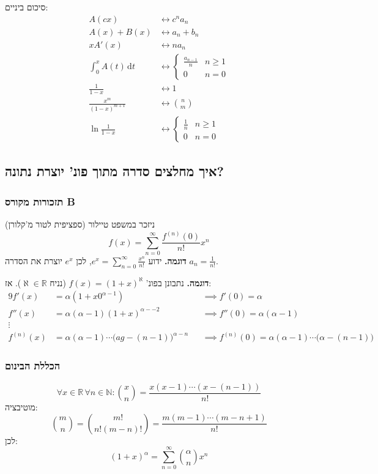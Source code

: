 \documentclass[]{article}
\newcommand\N     {\mathbb{N}}
\newcommand\R     {\mathbb{R}}
\newcommand\siff  {\longleftrightarrow}
\newcommand\al    {\aleph}
\newcommand\dt    {\,\mathrm{d}t}
\renewcommand\inf {\infty}
\newcommand\nsuminf   {\sum_{n = 0}^\inf}
\newcommand\co        {\colon}
\newcommand\ag        {\alpha}
\begin{document}
	
	סיכום ביניים: 
	\begin{align*}
		A(cx) & \siff c^na_n \\
		A(x) + B(x) & \siff a_n + b_n \\
		xA'(x) &\siff na_n \\
		\int^x_0 A(t) \dt& \siff \begin{cases}
			\frac{a_{n - 1}}{n} & n \ge 1\\
			0 & n = 0
		\end{cases} \\
		\frac{1}{1 - x} & \siff 1 \\
		\frac{x^m}{(1 - x)^{m + 1}} & \siff \binom{n}{m} \\
		\ln \frac{1}{1 - x} & \siff \begin{cases}
			\frac{1}{n} & n \ge 1\\
			0 & n = 0
		\end{cases}
	\end{align*}
	
	
	\subsection{איך מחלצים סדרה מתוך פונ' יוצרת נתונה? }
	\subsubsection{תזכורות מקורס B}
	ניזכר במשפט טיילור (ספציפית לטור מ'קלורן)
	\[ f(x) = \nsuminf \frac{f^{(n)}(0)}{n!}x^{n} \]
	\textbf{דוגמה. }ידוע $e^x = \nsuminf \frac{x^n}{n!}$, לכן $e^x$ יוצרת את הסדרה $a_n = \frac{1}{n!}$. 
	
	\textbf{דוגמה. }נתבונן בפונ' $f(x) = (1 + x)^{\al}$ (נניח $\al \in \R$). אז: 
	\begin{alignat*}{9}
		f'(x) &= \ag(1 + x0^{\ag - 1}) && \implies f'(0) = \ag \\
		f''(x) &= \ag(\ag - 1)(1 + x)^{\ag - -2} && \implies f''(0) = \ag(\ag - 1) \\
		\vdots \\
		f^{(n)}(x) &= \ag(\ag - 1) \cdots \big(ag - (n - 1)\big)^{\ag - n} &&\implies f^{(n)}(0) = \ag(\ag - 1) \cdots \big(\ag - (n  - 1) \big )
	\end{alignat*}
	
	\subsubsection{הכללת הבינום}
	\[ \forall x \in \R \, \forall n \in \N \co \binom{x}{n} = \frac{x(x - 1) \cdots (x - (n - 1))}{n!} \]
	מוטיבציה: 
	\[ \binom{m}{n} = \binom{m!}{n!(m - n)!} = \frac{m(m - 1) \cdots (m - n + 1)}{n!} \]
	לכן: 
	\[ (1 + x)^{\ag} = \nsuminf \binom{\ag}{n}x^n \]
	
\end{document}
